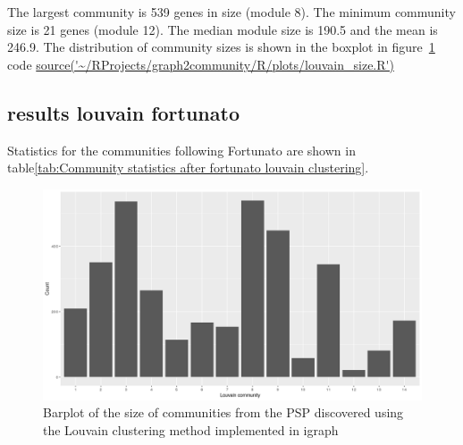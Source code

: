 The largest community is 539 genes in size (module 8). The minimum community size is 21 genes (module 12). The median module size is 190.5 and the mean is 246.9. The distribution of community sizes is shown in the boxplot in figure~\ref{fig:barplot_size_commmunities_using_louvain} code \url{source('~/RProjects/graph2community/R/plots/louvain_size.R')}
\subsection{results louvain fortunato}
Statistics for the communities following Fortunato \cite{fortunato2016community} are shown in table\ref{tab:Community statistics after fortunato louvain clustering}.

\begin{figure}
    \centering
    \includegraphics[width=\textwidth]{images/Rplot_Louvain_community_sizes.png}
    \caption{Barplot of the size of communities from the PSP discovered using the Louvain clustering method implemented in igraph}
    \label{fig:barplot_size_commmunities_using_louvain}
\end{figure}







